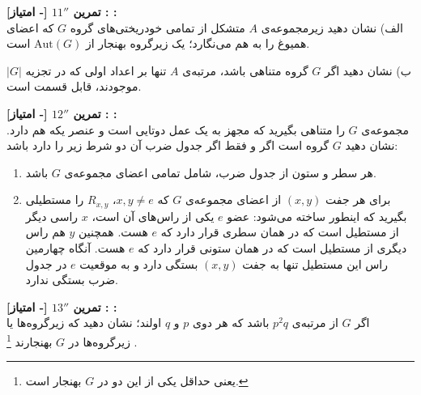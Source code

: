 \documentclass{article}
\newenvironment{exercise}[3][\unskip]{%
	\par
	\noindent
	\textbf{تمرین
		#1
		[#2 امتیاز] 
		\def\temp{#3}\ifx\temp\empty
		: 
		\else
		: #3 \vspace{0.5em} \\ \noindent
		\fi
}}{}
\begin{document}
\begin{exercise}[$11''$]{-}{ }
الف) نشان دهید زیرمجموعه‌ی  $A$ متشکل از تمامی خودریختی‌های گروه $G$ که اعضای همیوغ را به هم می‌نگارد؛ یک زیرگروه بهنجار از 
$\text{Aut}(G)$
است.

\noindent
ب) نشان دهید اگر $G$ گروه متناهی‌ باشد، مرتبه‌ی $A$  تنها بر اعداد اولی که در تجزیه 
$|G|$
موجودند، قابل قسمت است.
\end{exercise}



\begin{exercise}[$12''$]{-}{ }
	مجموعه‌ی 
	$G$ را متناهی بگیرید که مجهز به یک عمل دوتایی است و عنصر یکه هم دارد.
	نشان دهید 
	$G$ گروه است اگر و فقط اگر جدول ضرب آن دو شرط زیر را دارد باشد:
	\begin{enumerate}
		\item 
		هر سطر و ستون از جدول ضرب، شامل تمامی اعضای مجموعه‌ی 
		$G$ باشد.
		
		\item 
		برای هر جفت 
		$(x,y)$
		از اعضای مجموعه‌ی 
		$G$ که 
		$x,y \neq e$، 
		$R_{x,y}$
		را مستطیلی بگیرید که اینطور ساخته می‌شود: عضو $e$ یکی از راس‌های آن است، 
		$x$ راسی دیگر از مستطیل است که در همان سطری قرار دارد که $e$ هست. همچنین 
		$y$ هم راس دیگری از مستطیل است که در همان ستونی قرار دارد که $e$ هست.  آنگاه چهارمین راس این مستطیل تنها به جفت 
		$(x,y)$ بستگی دارد و به موقعیت 
		$e$ در جدول ضرب بستگی ندارد.
		
	\end{enumerate}
\end{exercise}



\begin{exercise}[$13''$]{-}{ }
	اگر $G$ از مرتبه‌ی 
	$p^2q$ باشد که هر دوی 
	$p$ و $q$ اولند؛ 
	نشان دهید که 
	زیرگروه‌ها یا 
	زیرگروه‌ها
	در $G$ بهنجارند
	\footnote{یعنی حداقل یکی از این دو در $G$ بهنجار است.}
	.
\end{exercise}





\vspace{1em}
 
\end{document}
